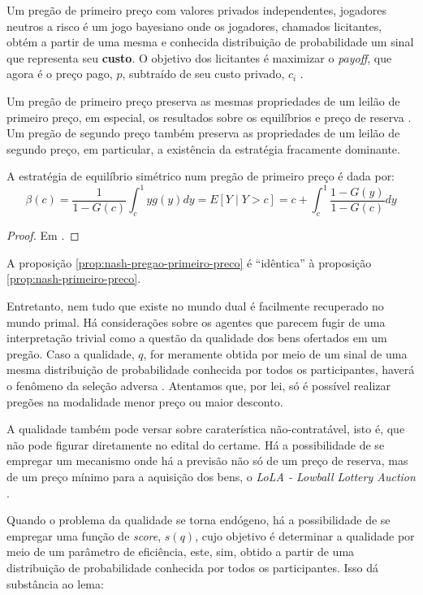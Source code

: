 Um pregão de primeiro preço com valores privados independentes, jogadores neutros a risco é um jogo bayesiano onde os jogadores, chamados licitantes, obtém a partir de uma mesma e conhecida distribuição de probabilidade um sinal que representa seu \textbf{custo}. O objetivo dos licitantes é maximizar o \emph{payoff}, que agora é o preço pago, $p$, subtraído de seu custo privado, $c_i$ \citet{Bugarin2022}.

Um pregão de primeiro preço preserva as mesmas propriedades de um leilão de primeiro preço, em especial, os resultados sobre os equilíbrios e preço de reserva \citet{Bugarin2022}. Um pregão de segundo preço também preserva as propriedades de um leilão de segundo preço, em particular, a existência da estratégia fracamente dominante.

\begin{proposicao}
	\label{prop:nash-pregao-primeiro-preco}
	A estratégia de equilíbrio simétrico num pregão de primeiro preço é dada por:
	\begin{equation}
		\beta(c) = \frac{1}{1-G(c)} \int_c^1 yg(y)dy = E[Y \mid Y > c] = c + \int_c^1 \frac{1-G(y)}{1-G(c)}dy
	\end{equation}
\end{proposicao}
\begin{proof}
	Em \citet{Bugarin2022}.
\end{proof}

A proposição \ref{prop:nash-pregao-primeiro-preco} é ``idêntica'' à proposição \ref{prop:nash-primeiro-preco}.

Entretanto, nem tudo que existe no mundo dual é facilmente recuperado no mundo primal. Há considerações sobre os agentes que parecem fugir de uma interpretação trivial como a questão da qualidade dos bens ofertados em um pregão. Caso a qualidade, $q$, for meramente obtida por meio de um sinal de uma mesma distribuição de probabilidade conhecida por todos os participantes, haverá o fenômeno da seleção adversa \citet{Che1993}. Atentamos que, por lei, só é possível realizar pregões na modalidade menor preço ou maior desconto. 

A qualidade também pode versar sobre caraterística não-contratável, isto é, que não pode figurar diretamente no edital do certame. Há a possibilidade de se empregar um mecanismo onde há a previsão não só de um preço de reserva, mas de um preço mínimo para a aquisição dos bens, o \emph{LoLA - Lowball Lottery Auction} \citet{villa:2022}.

Quando o problema da qualidade se torna endógeno, há a possibilidade de se empregar uma função de \emph{score}, $s(q)$, cujo objetivo é determinar a qualidade por meio de um parâmetro de eficiência, este, sim, obtido a partir de uma distribuição de probabilidade conhecida por todos os participantes. Isso dá substância ao lema:

